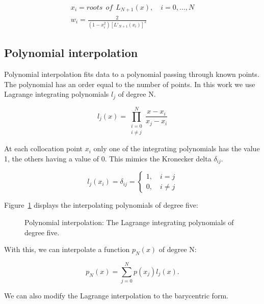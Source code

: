 \begin{gather}
	x_i = roots \: \: of \: \: L_{N + 1}(x), \quad i = 0, \ldots, N \\
	w_i = \frac{2}{(1-x_i^2) {\left[ L'_{N + 1}(x_i) \right]}^2}
\end{gather}

\subsection{Polynomial interpolation}\label{subsection:spectral_element_method:spectral_approximation:polynomial_interpolation}

Polynomial interpolation fits data to a polynomial passing through known points. The polynomial has
an order equal to the number of points. In this work we use Lagrange integrating polynomials \(l_j\)
of degree N.

\begin{equation}
	l_j(x) = \prod_{\substack{i = 0 \\ i \neq j}}^{N}\frac{x- x_i}{x_j - x_i}
\end{equation}

At each collocation point \(x_i\) only one of the integrating polynomials has the value 1, the
others having a value of 0. This mimics the Kronecker delta \(\delta_{i j}\).

\begin{equation}
	l_j(x_i) = \delta_{i j} = \left \{\begin{matrix}
	1, \quad i = j\\ 
	0, \quad i \neq j
	\end{matrix}\right.
\end{equation}

Figure~\ref{fig:interpolants} displays the interpolating polynomials of degree five:

\begin{figure}[H]
	\centering
	
	\caption{Polynomial interpolation: The Lagrange integrating polynomials of degree five.}\label{fig:interpolants}
\end{figure}

With this, we can interpolate a function \(p_N \left( x \right)\) of degree N\@:

\begin{equation}
	p_N(x) = \sum_{j = 0}^{N}p(x_j)l_j(x).
\end{equation}

We can also modify the Lagrange interpolation to the barycentric form.

